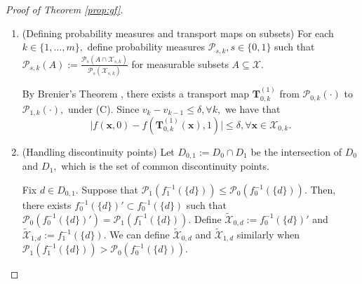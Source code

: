 \documentclass[10pt]{article} %
\begin{document}
\begin{proof}[Proof of Theorem \ref{prop:gf}]
\begin{enumerate}
            For each $k \in \{ 1, \ldots, m \},$ we compare the measures of the intervals as follows.
            
            If $ F_{1}^{cont}( (v_{k-1}, v_{k}] ) \le F_{0}^{cont} ( (v_{k-1}, v_{k} ] ),$ then there exists $ z_{k} \in [v_{k-1}, v_{k}] $ such that
            $ F_{1}^{cont}( (v_{k-1}, v_{k}] ) = F_{0}^{cont} ( (v_{k-1}, z_{k}] ).$
            Define $\mathcal{X}_{0, k} := f_{0}^{-1}( (v_{k-1}, z_{k}] \setminus D_{0} )$ and $\mathcal{X}_{1, k} := f_{1}^{-1}( (v_{k-1}, v_{k}] \setminus D_{1} ).$
            
            If $F_{1}^{cont}( (v_{k-1}, v_{k}] ) > F_{0}^{cont}( (v_{k-1}, v_{k}] ),$ we can define $z_{k},$ $\mathcal{X}_{0, k}$ and $\mathcal{X}_{1, k}$ similarly.
        

        \item (Defining probability measures and transport maps on subsets)
        For each $k \in \{ 1, \ldots, m \},$ define probability measures $\mathcal{P}_{s, k}, s \in \{ 0, 1 \}$ such that
        $
        \mathcal{P}_{s, k}(A) := \frac{\mathcal{P}_{s}(A \cap \mathcal{X}_{s, k})}{\mathcal{P}_{s} (\mathcal{X}_{s, k})}
        $
        for measurable subsets $A \subseteq \mathcal{X}.$       

        By Brenier's Theorem \citep{villani2008optimal, 10.1214/20-AOS1997}, there exists a transport map $\mathbf{T}_{0, k}^{(1)}$ from $\mathcal{P}_{0, k} (\cdot)$ to $\mathcal{P}_{1, k} (\cdot),$ 
            under (C).
        Since $v_{k} - v_{k-1} \le \delta, \forall k,$
        we have that 
        \begin{equation}\label{eq:prop:gf_1}
            \vert f(\mathbf{x}, 0) - f(\mathbf{T}_{0, k}^{(1)}(\mathbf{x}), 1) \vert \le \delta, \forall \mathbf{x} \in \mathcal{X}_{0, k}.
        \end{equation}

        \item (Handling discontinuity points)
            Let $D_{0, 1} := D_{0} \cap D_{1}$ be the intersection of $D_{0}$ and $D_{1},$ which is the set of common discontinuity points.

        Fix $d \in D_{0, 1}.$
        Suppose that 
        $\mathcal{P}_{1} ( f_{1}^{-1} ( \{d\} ) ) \le \mathcal{P}_{0} ( f_{0}^{-1} ( \{d\}) ).$
        Then, there exists $f_{0}^{-1}(\{d\})' \subset f_{0}^{-1}(\{d\})$ such that 
        $\mathcal{P}_{0} ( f_{0}^{-1} ( \{d\} )' ) = \mathcal{P}_{1} ( f_{1}^{-1} ( \{d\}) ).$
        Define $ \tilde{\mathcal{X}}_{0, d} := f_{0}^{-1}(\{d\})'$
        and
        $ \tilde{\mathcal{X}}_{1, d} := f_{1}^{-1}(\{d\}).$
        We can define $\tilde{\mathcal{X}}_{0, d}$ and $\tilde{\mathcal{X}}_{1, d}$ similarly when $\mathcal{P}_{1} ( f_{1}^{-1} ( \{d\} ) ) > \mathcal{P}_{0} ( f_{0}^{-1} ( \{d\}) ).$


\end{enumerate}
\end{proof}
\end{document}
